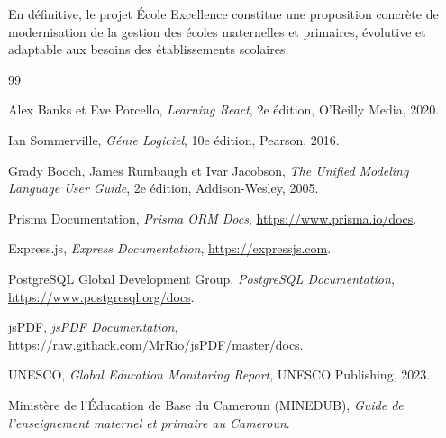 \documentclass[12pt, a4paper]{report}
\begin{document}
En définitive, le projet École Excellence constitue une proposition concrète de modernisation de la gestion des écoles maternelles et primaires, évolutive et adaptable aux besoins des établissements scolaires.

\begin{thebibliography}{99}

 Alex Banks et Eve Porcello, \textit{Learning React}, 2e édition, O'Reilly Media, 2020.

 Ian Sommerville, \textit{Génie Logiciel}, 10e édition, Pearson, 2016.

 Grady Booch, James Rumbaugh et Ivar Jacobson, \textit{The Unified Modeling Language User Guide}, 2e édition, Addison-Wesley, 2005.

 Prisma Documentation, \textit{Prisma ORM Docs}, \url{https://www.prisma.io/docs}.

 Express.js, \textit{Express Documentation}, \url{https://expressjs.com}.

 PostgreSQL Global Development Group, \textit{PostgreSQL Documentation}, \url{https://www.postgresql.org/docs}.

 jsPDF, \textit{jsPDF Documentation}, \url{https://raw.githack.com/MrRio/jsPDF/master/docs}.

 UNESCO, \textit{Global Education Monitoring Report}, UNESCO Publishing, 2023.

 Ministère de l'Éducation de Base du Cameroun (MINEDUB), \textit{Guide de l'enseignement maternel et primaire au Cameroun}.

\end{thebibliography}
\end{document}
